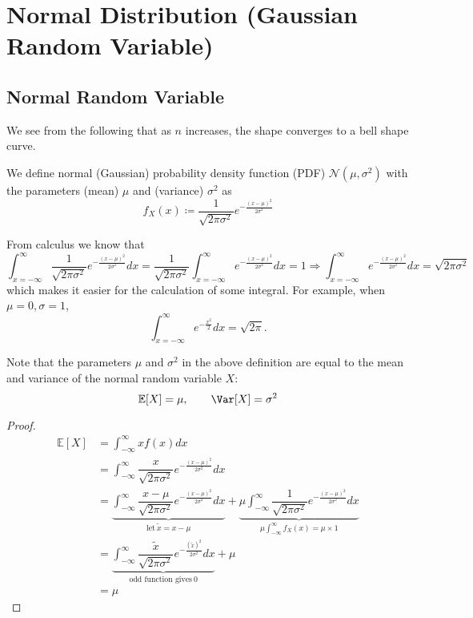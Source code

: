 \section{Normal Distribution (Gaussian Random Variable)}
\subsection{Normal Random Variable}
We see from the following that as \(n\) increases, the shape converges to a bell shape curve.

\begin{minipage}{0.5\textwidth}
    
\end{minipage}
\begin{minipage}{0.5\textwidth}
    
\end{minipage}

\begin{definition}
    We define normal (Gaussian) probability density function (PDF) \(\mathcal{N}(\mu, \sigma^2)\) with the parameters (mean) \(\mu\) and (variance) \(\sigma^2\) as 
    \[
        f_X(x) \coloneqq \dfrac{1}{\sqrt{2\pi \sigma ^2}}e^{-\frac{(x - \mu)^2}{2\sigma^2}}
    \]
\end{definition}
\begin{remark}
    From calculus we know that 
    \[
        \int_{x = -\infty}^{\infty} \dfrac{1}{\sqrt{2\pi \sigma ^2}}e^{-\frac{(x - \mu)^2}{2\sigma^2}} dx = \dfrac{1}{\sqrt{2\pi \sigma ^2}}\int_{x = -\infty}^{\infty} e^{-\frac{(x - \mu)^2}{2\sigma^2}} dx = 1 \Longrightarrow \int_{x = -\infty}^{\infty} e^{-\frac{(x - \mu)^2}{2\sigma^2}} dx = \sqrt{2\pi \sigma ^2}
    \]
    which makes it easier for the calculation of some integral. For example, when \(\mu =0, \sigma =1\),
    \[
        \int_{x = -\infty}^{\infty} e^{-\frac{x^2}{2}}dx = \sqrt{2\pi}. 
    \] 
\end{remark}

Note that the parameters \(\mu\) and \(\sigma^2\) in the above definition are equal to the mean and variance of the normal random variable \(X\): 
\[
    \mathbb{E}[X] = \mu, \quad\quad \Var[X] = \sigma^2
\]
\begin{proof}
    \[
    \begin{aligned}
        \mathbb{E}[X] &= \int_{-\infty}^{\infty} xf(x) dx \\
        &= \int_{-\infty}^{\infty} \dfrac{x}{\sqrt{2\pi \sigma ^2}}e^{-\frac{(x - \mu)^2}{2\sigma^2}} dx \\
        &= \underbrace{\int_{-\infty}^{\infty} \dfrac{x - \mu}{\sqrt{2\pi \sigma ^2}}e^{-\frac{(x - \mu)^2}{2\sigma^2}} dx}_{\text{let}\ \tilde{x} = x - \mu} + \underbrace{\mu\int_{-\infty}^{\infty} \dfrac{1}{\sqrt{2\pi \sigma ^2}}e^{-\frac{(x - \mu)^2}{2\sigma^2}} dx}_{\mu\int_{-\infty}^{\infty} f_X(x) = \mu \times 1} \\
        &= \underbrace{\int_{-\infty}^{\infty} \dfrac{\tilde{x}}{\sqrt{2\pi \sigma ^2}}e^{-\frac{(\tilde{x})^2}{2\sigma^2}} dx}_{\text{odd function gives}\ 0} + \mu \\
        &= \mu 
    \end{aligned}
    \]
\end{proof}

